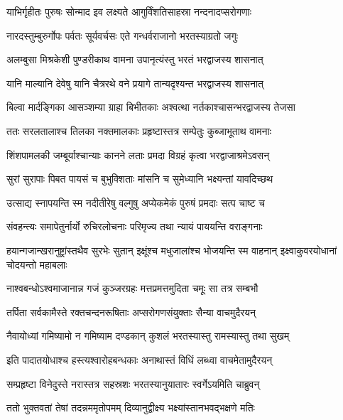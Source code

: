 \twolineshloka
{याभिर्गृहीतः पुरुषः सोन्माद इव लक्ष्यते}
{आगुर्विंशतिसाहस्रा नन्दनादप्सरोगणाः} %

\twolineshloka
{नारदस्तुम्बुरुर्गोपः पर्वतः सूर्यवर्चसः}
{एते गन्धर्वराजानो भरतस्याग्रतो जगुः} %

\twolineshloka
{अलम्बुसा मिश्रकेशी पुण्डरीकाथ वामना}
{उपानृत्यंस्तु भरतं भरद्वाजस्य शासनात्} %

\twolineshloka
{यानि माल्यानि देवेषु यानि चैत्ररथे वने}
{प्रयागे तान्यदृश्यन्त भरद्वाजस्य शासनात्} %

\twolineshloka
{बिल्वा मार्दङ्गिका आसञ्शम्या ग्राहा बिभीतकाः}
{अश्वत्था नर्तकाश्चासन्भरद्वाजस्य तेजसा} %

\twolineshloka
{ततः सरलतालाश्च तिलका नक्तमालकाः}
{प्रहृष्टास्तत्र सम्पेतुः कुब्जाभूताथ वामनाः} %

\twolineshloka
{शिंशपामलकी जम्बूर्याश्चान्याः कानने लताः}
{प्रमदा विग्रहं कृत्वा भरद्वाजाश्रमेऽवसन्} %

\twolineshloka
{सुरां सुरापाः पिबत पायसं च बुभुक्शिताः}
{मांसनि च सुमेध्यानि भक्ष्यन्तां यावदिच्छथ} %

\twolineshloka
{उत्साद्य स्नापयन्ति स्म नदीतीरेषु वल्गुषु}
{अप्येकमेकं पुरुषं प्रमदाः सत्प चाष्ट च} %

\twolineshloka
{संवहन्त्यः समापेतुर्नार्यो रुचिरलोचनाः}
{परिमृज्य तथा न्यायं पाययन्ति वराङ्गनाः} %

\threelineshloka
{हयान्गजान्खरानुष्ट्रांस्तथैव सुरभेः सुतान्}
{इक्षूंश्च मधुजालांश्च भोजयन्ति स्म वाहनान्}
{इक्ष्वाकुवरयोधानां चोदयन्तो महाबलाः} %

\twolineshloka
{नाश्वबन्धोऽश्वमाजानान्न गजं कुञ्जरग्रहः}
{मत्तप्रमत्तमुदिता चमूः सा तत्र सम्बभौ} %

\twolineshloka
{तर्पिता सर्वकामैस्ते रक्तचन्दनरूषिताः}
{अप्सरोगणसंयुक्ताः सैन्या वाचमुदैरयन्} %

\twolineshloka
{नैवायोध्यां गमिष्यामो न गमिष्याम दण्डकान्}
{कुशलं भरतस्यास्तु रामस्यास्तु तथा सुखम्} %

\twolineshloka
{इति पादातयोधाश्च हस्त्यश्वारोहबन्धकाः}
{अनाथास्तं विधिं लब्ध्वा वाचमेतामुदैरयन्} %

\twolineshloka
{सम्प्रहृष्टा विनेदुस्ते नरास्तत्र सहस्रशः}
{भरतस्यानुयातारः स्वर्गेऽयमिति चाब्रुवन्} %

\twolineshloka
{ततो भुक्तवतां तेषां तदन्नममृतोपमम्}
{दिव्यानुद्वीक्ष्य भक्ष्यांस्तानभवद्भक्षणे मतिः} %


